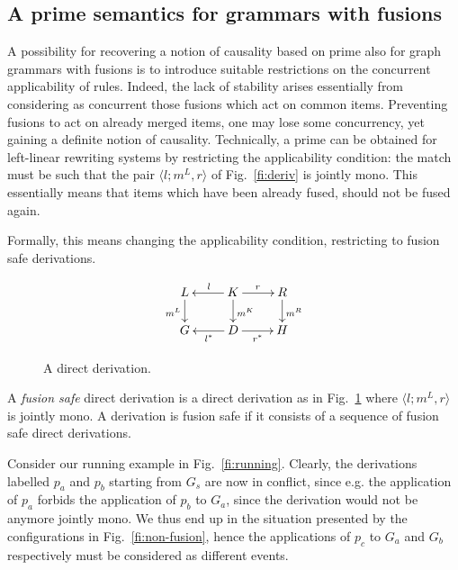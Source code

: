 \subsection{A prime {\esabbr} semantics for grammars with fusions}
\label{ss:prime-gg}

A possibility for recovering a notion of causality based on prime
{\esabbr} also for graph grammars with fusions is to
introduce suitable restrictions on the concurrent applicability of
rules.
%
Indeed, the lack of stability arises essentially from
considering as concurrent those fusions which act on common items.
Preventing fusions to act on already merged items, one may lose some
concurrency, yet gaining a definite notion of causality.
%
Technically, a prime {\esabbr} can be obtained for left-linear
rewriting systems by restricting the applicability condition: the
match must be such that the pair $\langle l; m^L, r \rangle$ of
Fig.~\ref{fi:deriv} is jointly mono. This essentially means that items
which have been already fused, should not be fused again.

Formally, this means changing the applicability condition, restricting
to fusion safe derivations.
 
\begin{figure}[t]
\[
\xymatrix@R=6mm{ 
  {L} \ar[d]_{m^L} & {K} \ar[l]_{l} \ar[r]^{r} 
  \ar[d]^{m^K} & {R} \ar[d]^{m^R}\\
  {G} & {D} \ar[l]^{l^*} \ar[r]_{r^*} & {H} }
\]
\caption{A direct derivation.}
\label{fi:deriv-jointly}
\end{figure}


\begin{definition}
  A \emph{fusion safe} direct derivation is a direct derivation as in
  Fig.~\ref{fi:deriv-jointly} where $\langle l; m^L, r \rangle$ is
  jointly mono. A derivation is fusion safe if it consists of a
  sequence of fusion safe direct derivations.
\end{definition}

Consider our running example in Fig.~\ref{fi:running}.
Clearly, the derivations labelled $p_a$ and $p_b$ starting from 
$G_s$ are now in conflict, since e.g. the application of $p_a$ 
forbids the application of $p_b$ to $G_a$, since the 
derivation would not be anymore jointly mono.
%
We thus end up in the situation presented by the configurations
in Fig.~\ref{fi:non-fusion}, 
hence the applications of $p_c$ to $G_a$ and $G_b$ respectively 
must be considered as different events.


